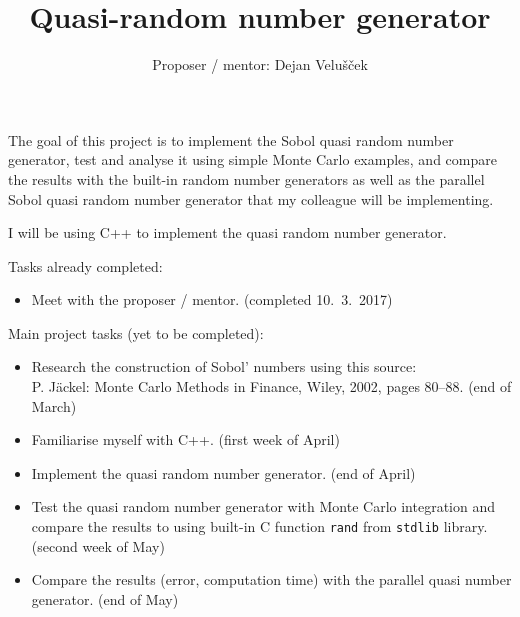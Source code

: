 \documentclass[11pt]{article}
\title{Quasi-random number generator}
\author{Proposer / mentor: Dejan Velušček}
\date{}
\begin{document}
\maketitle

The goal of this project is to implement the Sobol quasi random number generator, test and analyse it using simple Monte Carlo examples, and compare the results with the built-in random number generators as well as the parallel Sobol quasi random number generator that my colleague will be implementing. 

I will be using C++ to implement the quasi random number generator.

Tasks already completed: 
\begin{itemize}
    \item Meet with the proposer / mentor. (completed 10.~3.~2017)
\end{itemize}

Main project tasks (yet to be completed):
\begin{itemize}
    \item Research the construction of Sobol' numbers using this source: \\P. Jäckel: Monte Carlo Methods in Finance, Wiley, 2002, pages 80--88. (end of March)
    \item Familiarise myself with C++. (first week of April)
    \item Implement the quasi random number generator. (end of April)
    \item Test the quasi random number generator with Monte Carlo integration and compare the results to using built-in C function \texttt{rand} from \texttt{stdlib} library. (second week of May)
    \item Compare the results (error, computation time) with the parallel quasi number generator. (end of May)
\end{itemize}
\end{document}
